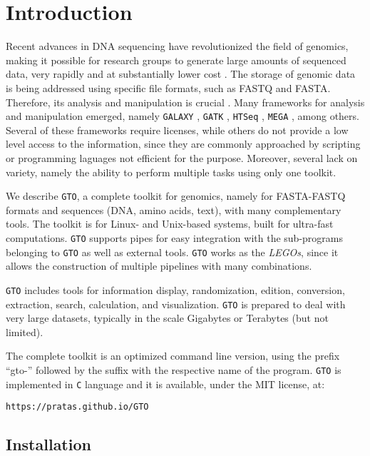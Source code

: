 \chapter{Introduction}
\label{intro}

Recent advances in {DNA} sequencing have revolutionized the field of genomics, making it possible for research groups to generate large amounts of sequenced data, very rapidly and at substantially lower cost \cite{Mardis-2017a}. The storage of genomic data is being addressed using specific file formats, such as FASTQ and FASTA. Therefore, its analysis and manipulation is crucial \cite{Buermans-2014a}. Many frameworks for analysis and manipulation emerged, namely \texttt{GALAXY} \cite{Giardine-2005a}, \texttt{GATK} \cite{DePristo-2011a}, \texttt{HTSeq} \cite{Anders-2014a}, \texttt{MEGA} \cite{Kumar-2016a}, among others. Several of these frameworks require licenses, while others do not provide a low level access to the information, since they are commonly approached
by scripting or programming laguages not efficient for the purpose. Moreover, several lack on variety, namely the ability to perform multiple tasks using only one toolkit.

We describe \texttt{GTO}, a complete toolkit for genomics, namely for FASTA-FASTQ formats and sequences (DNA, amino acids, text), with many complementary tools. The toolkit is for Linux- and Unix-based systems, built for ultra-fast computations. \texttt{GTO} supports pipes for easy integration with the sub-programs belonging to \texttt{GTO} as well as external tools. \texttt{GTO} works as the \textit{LEGOs}, since it allows the construction of multiple pipelines with many combinations.

\texttt{GTO} includes tools for information display, randomization, edition, conversion, extraction, search, calculation, and visualization. \texttt{GTO} is prepared to deal with very large datasets, typically in the scale Gigabytes or Terabytes (but not limited).

The complete toolkit is an optimized command line version, using the prefix ``gto-'' followed by the suffix with the respective name of the program. \texttt{GTO} is implemented in \texttt{C} language and it is available, under the MIT license, at:
\begin{lstlisting}
https://pratas.github.io/GTO
\end{lstlisting}

\section{Installation}

